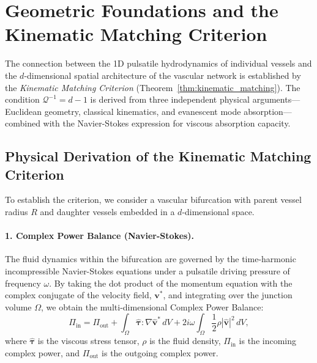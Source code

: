 \documentclass[11pt,a4paper]{article}
\theoremstyle{remark}
\begin{document}
\section{Geometric Foundations and the Kinematic Matching Criterion}
\label{sec:S4}

The connection between the 1D pulsatile hydrodynamics of individual vessels and
the $d$-dimensional spatial architecture of the vascular network is established
by the \emph{Kinematic Matching Criterion}
(Theorem~\ref{thm:kinematic_matching}). The condition $\mathcal{Q}^{-1} = d-1$
is derived from three independent physical arguments---Euclidean geometry,
classical kinematics, and evanescent mode absorption---combined with the
Navier-Stokes expression for viscous absorption capacity.

\subsection{Physical Derivation of the Kinematic Matching Criterion}

To establish the criterion, we consider a vascular bifurcation with parent
vessel radius $R$ and daughter vessels embedded in a $d$-dimensional space.

\paragraph{1. Complex Power Balance (Navier-Stokes).}
The fluid dynamics within the bifurcation are governed by the time-harmonic
incompressible Navier-Stokes equations under a pulsatile driving pressure of
frequency $\omega$. By taking the dot product of the momentum equation with the
complex conjugate of the velocity field, $\mathbf{v}^*$, and integrating over
the junction volume $\Omega$, we obtain the multi-dimensional Complex Power
Balance:
\begin{equation}\label{eq:complex_power_balance_supp}
    \Pi_{\mathrm{in}} = \Pi_{\mathrm{out}} + \int_\Omega \hat{\boldsymbol{\tau}} : \nabla\hat{\mathbf{v}}^* \, dV + 2i\omega \int_\Omega \frac{1}{2}\rho |\hat{\mathbf{v}}|^2 \, dV,
\end{equation}
where $\hat{\boldsymbol{\tau}}$ is the viscous stress tensor, $\rho$ is the
fluid density, $\Pi_{\mathrm{in}}$ is the incoming complex power, and
$\Pi_{\mathrm{out}}$ is the outgoing complex power.
\end{document}
